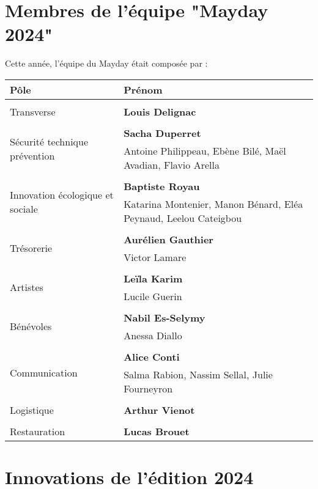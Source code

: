 \documentclass[12pt,a4paper]{report}
\begin{document}
\chapter{Membres de l'équipe "Mayday 2024"}
Cette année, l'équipe du Mayday était composée par :
\begin{center}
\begin{tabular}{| m{3cm} | m{9cm} |}
\hline
Pôle & Prénom \\ 
 \hline\hline\\
Transverse & \textbf{Louis Delignac}\\ 
\hline\\
\multirow{2}{5em}{Sécurité technique prévention} & \textbf{Sacha Duperret} \\ 
& Antoine Philippeau, Ebène Bilé, Maël Avadian, Flavio Arella\\  
 \hline\\
 \multirow{2}{5em}{Innovation écologique et sociale} & \textbf{Baptiste Royau} \\ 
& Katarina Montenier, Manon Bénard, Eléa Peynaud, Leelou Cateigbou\\
 \hline\\
  \multirow{2}{5em}{Trésorerie} & \textbf{Aurélien Gauthier} \\ 
& Victor Lamare\\
 \hline\\
 \multirow{2}{5em}{ Artistes} & \textbf{Leïla Karim} \\
& Lucile Guerin\\
 \hline\\
\multirow{2}{5em}{Bénévoles} & \textbf{Nabil Es-Selymy} \\ 
& Anessa Diallo\\
 \hline\\
\multirow{2}{7em}{Communication} & \textbf{Alice Conti} \\ 
& Salma Rabion, Nassim Sellal, Julie Fourneyron\\
 \hline\\
 \multirow{1}{5em}{Logistique} & \textbf{Arthur Vienot} \\ 
 \hline\\
 \multirow{1}{6em}{Restauration} & \textbf{Lucas Brouet} \\ 
 \hline
\end{tabular}
\end{center}

\chapter{Innovations de l'édition 2024}
\end{document}
